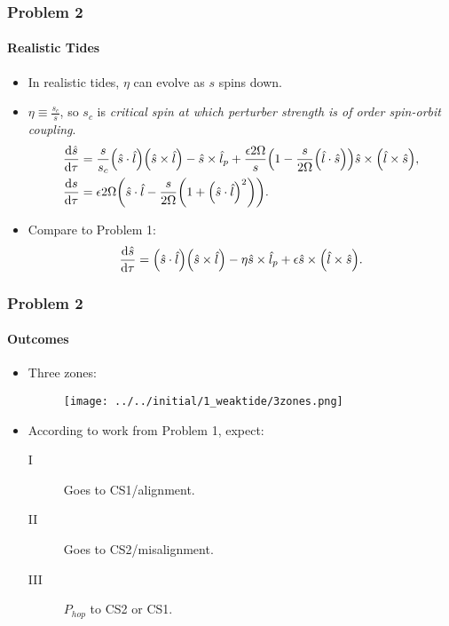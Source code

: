 \documentclass[dvipsnames, 11pt]{beamer}
\newcommand*{\rd}[2]{\frac{\mathrm{d}#1}{\mathrm{d}#2}}
\DeclarePairedDelimiter\p{\lparen}{\rparen}
\begin{document}
\begin{frame}
    \frametitle{Problem 2}
    \framesubtitle{Realistic Tides}

    \begin{itemize}
        \item In realistic tides, $\eta$ can evolve as $s$ spins down.

        \item $\eta \equiv \frac{s_c}{s}$, so $s_c$ is \emph{critical spin at
            which perturber strength is of order spin-orbit coupling}.
            \begin{align}
                \rd{\hat{s}}{\tau}
                    &= \frac{s}{s_c}\p*{\hat{s} \cdot \hat{l}}
                        \p*{\hat{s} \times \hat{l}}
                        - \hat{s} \times \hat{l}_p
                        + \frac{\epsilon 2\Omega}{s}
                            \p*{1 - \frac{s}{2\Omega}\p*{\hat{l} \cdot \hat{s}}}
                                \hat{s} \times \p*{\hat{l} \times \hat{s}},\\
                \rd{s}{\tau}
                    &= \epsilon 2\Omega \p*{\hat{s} \cdot \hat{l} -
                        \frac{s}{2\Omega}\p*{1 + \p*{\hat{s} \cdot \hat{l}}^2}}.
            \end{align}

        \item Compare to Problem 1:
            \begin{equation*}
                \rd{\hat{s}}{\tau}
                    = \p*{\hat{s} \cdot \hat{l}}\p*{\hat{s} \times \hat{l}}
                        - \eta\hat{s} \times \hat{l}_p +
                        \epsilon \hat{s} \times \p*{\hat{l} \times \hat{s}}.
            \end{equation*}
    \end{itemize}
\end{frame}

\begin{frame}
    \frametitle{Problem 2}
    \framesubtitle{Outcomes}

    \begin{itemize}
        \item Three zones:
            \begin{figure}[t]
                \centering
                \texttt{[image: ../../initial/1\_weaktide/3zones.png]}
            \end{figure}

        \item According to work from Problem 1, expect:
            \begin{description}
                \item[I] Goes to CS1/alignment.
                \item[II] Goes to CS2/misalignment.
                \item[III] $P_{hop}$ to CS2 or CS1.
            \end{description}
    \end{itemize}
\end{frame}
\end{document}
